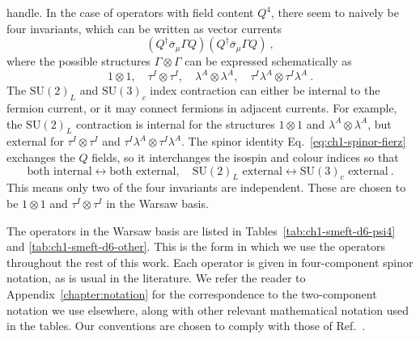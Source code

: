 handle. In the case of operators with field content $Q^{4}$, there seem to
naively be four invariants, which can be written as vector currents
\begin{equation}
  (Q^{\dagger} \bar{\sigma}_{\mu} \Gamma Q) (Q^{\dagger} \bar{\sigma}_{\mu} \Gamma Q) \ ,
\end{equation}
where the possible structures $\Gamma \otimes \Gamma$ can be expressed schematically as
\begin{equation}
  1 \otimes 1,\quad \tau^{I} \otimes \tau^{I},\quad \lambda^{A} \otimes \lambda^{A},\quad \tau^{I} \lambda^{A} \otimes \tau^{I} \lambda^{A} \ .
\end{equation}
The $\mathrm{SU}(2)_{L}$ and $\mathrm{SU}(3)_{c}$ index contraction can either
be internal to the fermion current, or it may connect fermions in adjacent
currents. For example, the $\mathrm{SU}(2)_{L}$ contraction is internal for the
structures $1 \otimes 1$ and $\lambda^{A} \otimes \lambda^{A}$, but external for
$\tau^{I} \otimes \tau^{I}$ and
$\tau^{I} \lambda^{A} \otimes \tau^{I} \lambda^{A}$. The spinor identity
Eq.~\eqref{eq:ch1-spinor-fierz} exchanges the $Q$ fields, so it interchanges the
isospin and colour indices so that
\begin{equation}
  \text{both internal} \leftrightarrow \text{both external},\quad \mathrm{SU}(2)_{L} \text{ external} \leftrightarrow \mathrm{SU}(3)_{c} \text{ external} \ .
\end{equation}
This means only two of the four invariants are independent. These are chosen to
be $1 \otimes 1$ and $\tau^{I} \otimes \tau^{I}$ in the Warsaw basis.

The operators in the Warsaw basis are listed in Tables~\ref{tab:ch1-smeft-d6-psi4}
and \ref{tab:ch1-smeft-d6-other}. This is the form in which we use the operators
throughout the rest of this work. Each operator is given in four-component
spinor notation, as is usual in the literature. We refer the reader to
Appendix~\ref{chapter:notation} for the correspondence to the two-component
notation we use elsewhere, along with other relevant mathematical notation used
in the tables. Our conventions are chosen to comply with those of
Ref.~\cite{Aebischer:2017ugx}.

